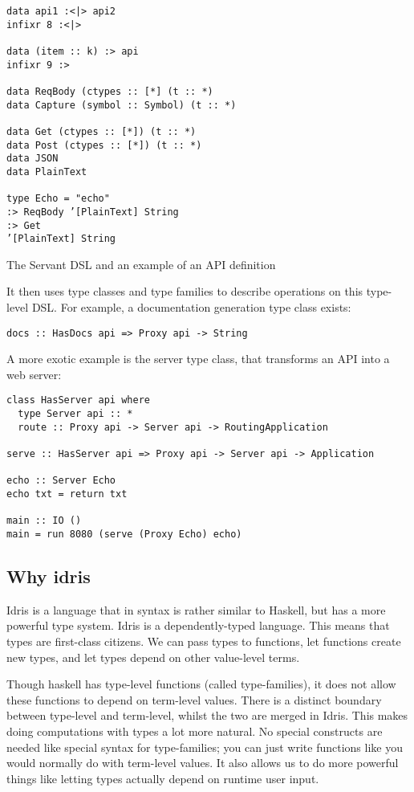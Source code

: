 \documentclass[12pt,a4paper]{article}
\begin{document}
\begin{listing}[H]
\begin{verbatim}
data api1 :<|> api2
infixr 8 :<|>

data (item :: k) :> api
infixr 9 :>

data ReqBody (ctypes :: [*] (t :: *)
data Capture (symbol :: Symbol) (t :: *)

data Get (ctypes :: [*]) (t :: *)
data Post (ctypes :: [*]) (t :: *)
data JSON
data PlainText

type Echo = "echo"
:> ReqBody ’[PlainText] String
:> Get
’[PlainText] String
\end{verbatim}
\caption{The Servant DSL and an example of an API definition}
\label{lab:servant}
\end{listing}

It then uses type classes and type families to describe operations on this type-level DSL. For example,
a documentation generation type class exists:
\begin{verbatim}
docs :: HasDocs api => Proxy api -> String
\end{verbatim}

A more exotic example is the server type class, that transforms an API into a web server:
\begin{verbatim}
class HasServer api where
  type Server api :: *
  route :: Proxy api -> Server api -> RoutingApplication

serve :: HasServer api => Proxy api -> Server api -> Application

echo :: Server Echo 
echo txt = return txt

main :: IO ()
main = run 8080 (serve (Proxy Echo) echo)
\end{verbatim}


\subsection{Why idris}
Idris is a language that in syntax is rather similar to Haskell, but has a more powerful type system. Idris is a dependently-typed language. This means that types are first-class citizens. We can pass types to functions, let functions create new types, and let types depend on other value-level terms.

Though haskell has type-level functions (called type-families), it does not allow these functions to depend on term-level values. There is a distinct boundary between type-level and term-level, whilst the two are merged in Idris. This makes doing computations with types a lot more natural. No special constructs are needed like special syntax for type-families; you can just write functions like you would normally do with term-level values. It also allows us to do more powerful things like letting types actually depend on runtime user input.
\end{document}
